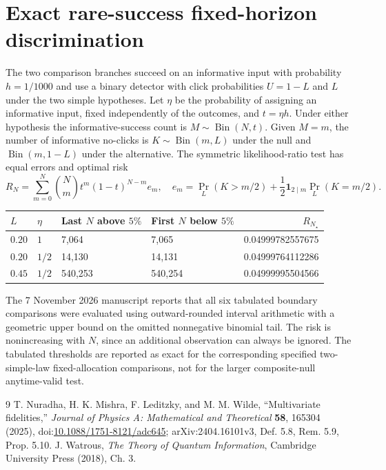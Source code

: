 \documentclass[10pt,letterpaper]{article}
\begin{document}
\section{Exact rare-success fixed-horizon discrimination}
The two comparison branches succeed on an informative input with probability $h=1/1000$ and use a binary detector with click probabilities $U=1-L$ and $L$ under the two simple hypotheses. Let $\eta$ be the probability of assigning an informative input, fixed independently of the outcomes, and $t=\eta h$. Under either hypothesis the informative-success count is $M\sim\operatorname{Bin}(N,t)$. Given $M=m$, the number of informative no-clicks is $K\sim\operatorname{Bin}(m,L)$ under the null and $\operatorname{Bin}(m,1-L)$ under the alternative. The symmetric likelihood-ratio test has equal errors and optimal risk
\[
R_N=\sum_{m=0}^N{N\choose m}t^m(1-t)^{N-m} e_m,\quad e_m=\Pr_{L}(K>m/2)+\frac12\mathbf 1_{2\mid m}\Pr_L(K=m/2).
\]
\begin{center}
\begin{tabular}{@{}llllr@{}}
\toprule
$L$ & $\eta$ & Last $N$ above $5\%$ & First $N$ below $5\%$ & $R_{N_\star}$\\
\midrule
$0.20$ & $1$ & 7,064 & 7,065 & 0.04999782557675\\
$0.20$ & $1/2$ & 14,130 & 14,131 & 0.04999764112286\\
$0.45$ & $1/2$ & 540,253 & 540,254 & 0.04999995504566\\
\bottomrule
\end{tabular}
\end{center}
The 7 November 2026 manuscript reports that all six tabulated boundary comparisons were evaluated using outward-rounded interval arithmetic with a geometric upper bound on the omitted nonnegative binomial tail. The risk is nonincreasing with $N$, since an additional observation can always be ignored. The tabulated thresholds are reported as exact for the corresponding specified two-simple-law fixed-allocation comparisons, not for the larger composite-null anytime-valid test.

\begin{thebibliography}{9}
 T. Nuradha, H. K. Mishra, F. Leditzky, and M. M. Wilde, ``Multivariate fidelities,'' \emph{Journal of Physics A: Mathematical and Theoretical} \textbf{58}, 165304 (2025), doi:\href{https://doi.org/10.1088/1751-8121/adc645}{10.1088/1751-8121/adc645}; arXiv:2404.16101v3, Def. 5.8, Rem. 5.9, Prop. 5.10.
 J. Watrous, \emph{The Theory of Quantum Information}, Cambridge University Press (2018), Ch. 3.
\end{thebibliography}
\end{document}

